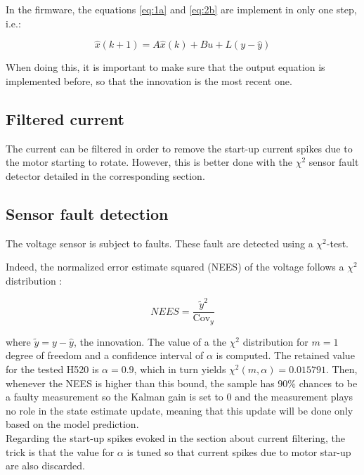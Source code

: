 \documentclass{article}
\begin{document}
In the firmware, the equations \eqref{eq:1a} and \eqref{eq:2b} are implement in only one step, i.e.: 

\begin{equation}
\hat{x}(k+1) = A\hat{x}(k) + Bu + L(y-\hat{y})
\label{eq:state update}
\end{equation}

\noindent When doing this, it is important to make sure that the output equation is implemented before, so that the innovation is the most recent one.

\subsection{Filtered current}
The current can be filtered in order to remove the start-up current spikes due to the motor starting to rotate. However, this is better done with the $\chi^2$ sensor fault detector detailed in the corresponding section.

\subsection{Sensor fault detection}
The voltage sensor is subject to faults. These fault are detected using a $\chi^2$-test.

Indeed, the normalized error estimate squared (NEES) of the voltage follows a $\chi^2$ distribution :

\begin{equation}
NEES = \frac{\tilde{y}^2}{\text{Cov}_y}
\label{nees}
\end{equation}

\noindent where $\tilde{y} = y - \hat{y}$, the innovation. The value of a the $\chi^2$ distribution for $m=1$ degree of freedom and a confidence interval of $\alpha$ is computed. The retained value for the tested H520 is $\alpha=0.9$, which in turn yields $\chi^2(m,\alpha)=0.015791$. Then, whenever the NEES is higher than this bound, the sample has 90\% chances to be a faulty measurement so the Kalman gain is set to 0 and the measurement plays no role in the state estimate update, meaning that this update will be done only based on the model prediction. \\

Regarding the start-up spikes evoked in the section about current filtering, the trick is that the value for $\alpha$ is tuned so that current spikes due to motor star-up are also discarded.
\end{document}
